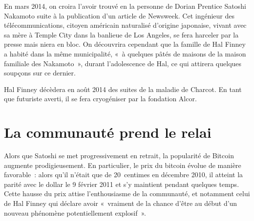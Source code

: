 En mars 2014, on croira l'avoir trouvé en la personne de Dorian Prentice Satoshi Nakamoto suite à la publication d'un article de Newsweek. Cet ingénieur des télécommunications, citoyen américain naturalisé d'origine japonaise, vivant avec sa mère à Temple City dans la banlieue de Los Angeles, se fera harceler par la presse mais niera en bloc. On découvrira cependant que la famille de Hal Finney a habité dans la même municipalité, «~à quelques pâtés de maisons de la maison familiale des Nakamoto~», durant l'adolescence de Hal, ce qui attirera quelques soupçons sur ce dernier.

Hal Finney décèdera en août 2014 des suites de la maladie de Charcot. En tant que futuriste averti, il se fera cryogéniser par la fondation Alcor.

\section*{La communauté prend le relai}

Alors que Satoshi se met progressivement en retrait, la popularité de Bitcoin augmente prodigieusement. En particulier, le prix du bitcoin évolue de manière favorable~: alors qu'il n'était que de 20~centimes en décembre 2010, il atteint la parité avec le dollar le 9 février 2011 et s'y maintient pendant quelques temps. Cette hausse du prix attise l'enthousiasme de la communauté, et notamment celui de Hal Finney qui déclare avoir «~vraiment de la chance d'être au début d'un nouveau phénomène potentiellement explosif~».


